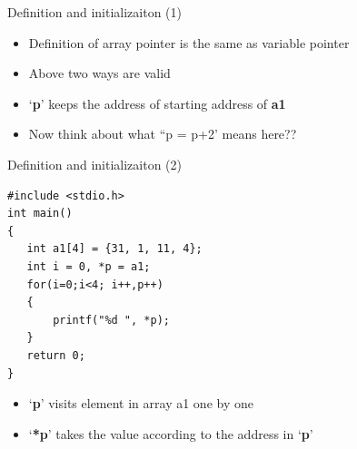 \begin{frame}[fragile]{Definition and initializaiton (1)}
\begin{center}
\end{center}
\vspace{0.2in}
\begin{itemize}
	\item {Definition of array pointer is the same as variable pointer}
	\item {Above two ways are valid}
	\item {`\textbf{p}' keeps the address of starting address of \textbf{a1}}
	\item {Now think about what ``p = p+2' means here??}
\end{itemize}
\end{frame}

\begin{frame}[fragile]{Definition and initializaiton (2)}
\vspace{-0.15in}
\begin{lstlisting}[xleftmargin=0.1\linewidth, linewidth=0.8\linewidth]
#include <stdio.h>
int main()
{
   int a1[4] = {31, 1, 11, 4};
   int i = 0, *p = a1;
   for(i=0;i<4; i++,p++)
   {
       printf("%d ", *p);
   }
   return 0;
}
\end{lstlisting}

\begin{itemize}
	\item {`\textbf{p}' visits element in array a1 one by one}
	\item {`\textbf{*p}' takes the value according to the address in `\textbf{p}'}
\end{itemize}
\end{frame}

